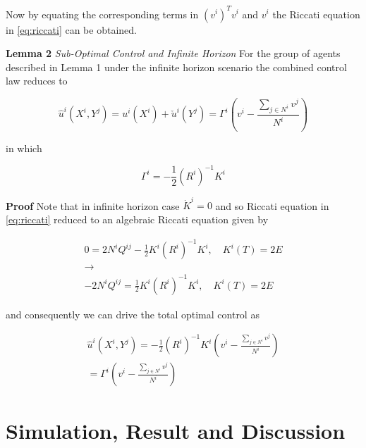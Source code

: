 \documentclass[conference]{IEEEtran}
\begin{document}
Now by equating the corresponding terms in $(v^{i})^{T}v^{i}$ and $v^{i}$ the Riccati equation in \ref{eq:riccati} can be obtained.

\textbf{Lemma 2} \textit{Sub-Optimal Control and Infinite Horizon} For the group of agents described in Lemma 1 under the infinite horizon scenario the combined control law reduces to


\begin{equation}\label{eq:totalControlInputInfiniteHorizon}
\hat{u}^{i}(X^{i},Y^{j})=u^{i}(X^{i})+\check{u}^{i}(Y^{j})=\Gamma^{i}(v^{i}-\frac{\sum_{j \in N^{i}}v^{j}}{N^{i}})
\end{equation}

in which

\begin{equation}\label{eq:Gamma}
\Gamma^{i}=-\frac{1}{2}(R^{i})^{-1}K^{i}
\end{equation}

\textbf{Proof} Note that in infinite horizon case $\dot{K}^{i}=0$ and so Riccati equation in \ref{eq:riccati} reduced to an algebraic Riccati equation given by

\begin{equation}\label{eq:ARE}
\begin{split}
0=2N^{i}Q^{ij}-\frac{1}{2}K^{i}(R^{i})^{-1}K^{i}, \quad K^{i}(T)=2E\\
\to \\
-2N^{i}Q^{ij}=\frac{1}{2}K^{i}(R^{i})^{-1}K^{i}, \quad K^{i}(T)=2E
\end{split}
\end{equation}



and consequently we can drive the total optimal control as

\begin{equation}\label{eq:Proof2}
\begin{split}
\hat{u}^{i}(X^{i},Y^{j})=-\frac{1}{2}(R^{i})^{-1}K^{i}(v^{i}-\frac{\sum_{j \in N^{i}}v^{j}}{N^{i}})\\
=\Gamma^{i}(v^{i}-\frac{\sum_{j \in N^{i}}v^{j}}{N^{i}})
\end{split}
\end{equation}


\section{Simulation, Result and Discussion}
\end{document}
